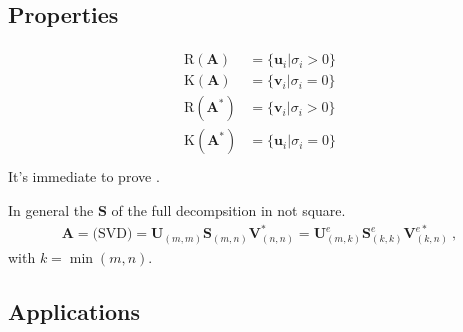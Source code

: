 \documentclass[letterpaper,10pt,english]{jupyterBook}
\begin{document}
\subsection{Properties}
\label{\detokenize{ch/linear-algebra/svd:properties}}\label{\detokenize{ch/linear-algebra/svd:math-svd-properties}}
\sphinxAtStartPar
{}
\begin{equation*}
\begin{split}\begin{aligned}
  \text{R}(\mathbf{A})   & = \{ \mathbf{u}_i | \sigma_i > 0 \} \\
  \text{K}(\mathbf{A})   & = \{ \mathbf{v}_i | \sigma_i = 0 \} \\
  \text{R}(\mathbf{A}^*) & = \{ \mathbf{v}_i | \sigma_i > 0 \} \\
  \text{K}(\mathbf{A}^*) & = \{ \mathbf{u}_i | \sigma_i = 0\} \\
\end{aligned}\end{split}
\end{equation*}
\sphinxAtStartPar
It’s immediate to prove {\hyperref[\detokenize{ch/linear-algebra/matrices:math-linear-algebra-thms-raperpkah}]{}}.

\sphinxAtStartPar
{} In general the \(\mathbf{S}\) of the full decompsition in not square.
\begin{equation*}
\begin{split}\mathbf{A} = \text{(SVD)} = \mathbf{U}_{(m,m)} \mathbf{S}_{(m,n)} \mathbf{V}^*_{(n,n)} = \mathbf{U}^e_{(m,k)} \mathbf{S}^e_{(k,k)} \mathbf{V}^{e *}_{(k,n)} \ ,\end{split}
\end{equation*}
\sphinxAtStartPar
with \(k = \min(m,n)\).


\subsection{Applications}
\label{\detokenize{ch/linear-algebra/svd:applications}}\label{\detokenize{ch/linear-algebra/svd:math-svd-applications}}
\end{document}
